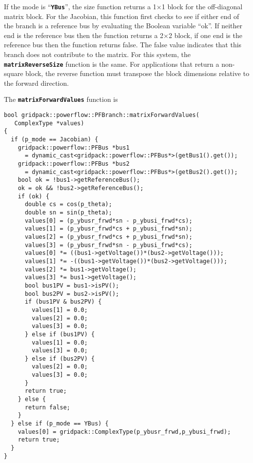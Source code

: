 If the mode is ``\texttt{\textbf{YBus}}'', the size function returns a
1$\mathrm{\times}$1 block for the off-diagonal matrix block. For the Jacobian,
this function first checks to see if either end of the branch is a reference bus
by evaluating the Boolean variable ``ok''. If neither end is the reference bus
then the function returns a 2$\mathrm{\times}$2 block, if one end is the
reference bus then the function returns false. The false value indicates that
this branch does not contribute to the matrix. For this system, the
\texttt{\textbf{matrixReverseSize}} function is the same. For applications that
return a non-square block, the reverse function must transpose the block dimensions relative to the forward direction.

The \texttt{\textbf{matrixForwardValues}} function is

{
\color{red}
\begin{Verbatim}[fontseries=b]
bool gridpack::powerflow::PFBranch::matrixForwardValues(
   ComplexType *values)
{
  if (p_mode == Jacobian) {
    gridpack::powerflow::PFBus *bus1
      = dynamic_cast<gridpack::powerflow::PFBus*>(getBus1().get());
    gridpack::powerflow::PFBus *bus2
      = dynamic_cast<gridpack::powerflow::PFBus*>(getBus2().get());
    bool ok = !bus1->getReferenceBus();
    ok = ok && !bus2->getReferenceBus();
    if (ok) {
      double cs = cos(p_theta);
      double sn = sin(p_theta);
      values[0] = (p_ybusr_frwd*sn - p_ybusi_frwd*cs);
      values[1] = (p_ybusr_frwd*cs + p_ybusi_frwd*sn);
      values[2] = (p_ybusr_frwd*cs + p_ybusi_frwd*sn);
      values[3] = (p_ybusr_frwd*sn - p_ybusi_frwd*cs);
      values[0] *= ((bus1->getVoltage())*(bus2->getVoltage()));
      values[1] *= -((bus1->getVoltage())*(bus2->getVoltage()));
      values[2] *= bus1->getVoltage();
      values[3] *= bus1->getVoltage();
      bool bus1PV = bus1->isPV();
      bool bus2PV = bus2->isPV();
      if (bus1PV & bus2PV) {
        values[1] = 0.0;
        values[2] = 0.0;
        values[3] = 0.0;
      } else if (bus1PV) {
        values[1] = 0.0;
        values[3] = 0.0;
      } else if (bus2PV) {
        values[2] = 0.0;
        values[3] = 0.0;
      }
      return true;
    } else {
      return false;
    }
  } else if (p_mode == YBus) {
    values[0] = gridpack::ComplexType(p_ybusr_frwd,p_ybusi_frwd);
    return true;
  }
}
\end{Verbatim}
}

